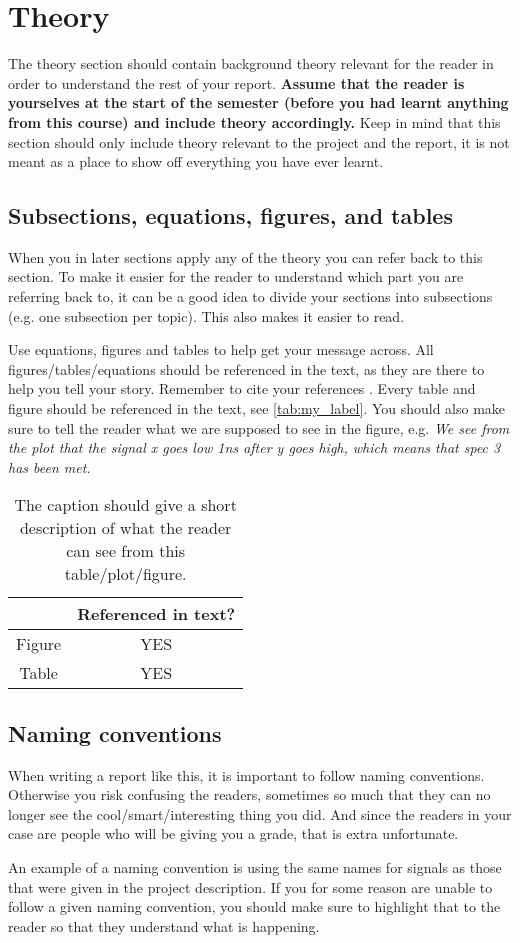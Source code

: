 \section{Theory}

The theory section should contain background theory relevant for the reader in order to understand the rest of your report.\textbf{ Assume that the reader is yourselves at the start of the semester (before you had learnt anything from this course) and include theory accordingly.} Keep in mind that this section should only include theory relevant to the project and the report, it is not meant as a place to show off everything you have ever learnt.



\subsection{Subsections, equations, figures, and tables}\label{subsec:theory_aSubsection}
When you in later sections apply any of the theory you can refer back to this section. To make it easier for the reader to understand which part you are referring back to, it can be a good idea to divide your sections into subsections (e.g. one subsection per topic). This also makes it easier to read.

Use equations, figures and tables to help get your message across. All figures/tables/equations should be referenced in the text, as they are there to help you tell your story. Remember to cite your references \cite{example}. Every table and figure should be referenced in the text, see \autoref{tab:my_label}. You should also make sure to tell the reader what we are supposed to see in the figure, e.g. \textit{We see from the plot that the signal x goes low 1ns after y goes high, which means that spec 3 has been met.}

\begin{table}[h]
    \centering
    \caption{The caption should give a short description of what the reader can see from this table/plot/figure.}
    \begin{tabular}{c|c}
         & Referenced in text? \\
         \hline
        Figure & YES\\
        Table & YES\\
    \end{tabular}
    \label{tab:my_label}
\end{table}

\subsection{Naming conventions}
When writing a report like this, it is important to follow naming conventions. Otherwise you risk confusing the readers, sometimes so much that they can no longer see the cool/smart/interesting thing you did. And since the readers in your case are people who will be giving you a grade, that is extra unfortunate. 

An example of a naming convention is using the same names for signals as those that were given in the project description. If you for some reason are unable to follow a given naming convention, you should make sure to highlight that to the reader so that they understand what is happening.